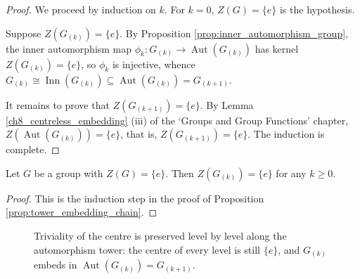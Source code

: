 \begin{proof}
We proceed by induction on $k$. For $k=0$, $Z(G)=\{e\}$ is the hypothesis.

Suppose $Z(G_{(k)})=\{e\}$. By Proposition \ref{prop:inner_automorphism_group}, the inner automorphism map $\phi_k: G_{(k)} \to \operatorname{Aut}(G_{(k)})$ has kernel $Z(G_{(k)})=\{e\}$, so $\phi_k$ is injective, whence $G_{(k)} \cong \operatorname{Inn}(G_{(k)}) \subseteq \operatorname{Aut}(G_{(k)}) = G_{(k+1)}$.

It remains to prove that $Z(G_{(k+1)})=\{e\}$. By Lemma \ref{ch8_centreless_embedding} (iii) of the `Groups and Group Functions' chapter, $Z(\operatorname{Aut}(G_{(k)}))=\{e\}$, that is, $Z(G_{(k+1)})=\{e\}$. The induction is complete.
\end{proof}

\begin{lemma}\label{ch10_centreless_preserved}
Let $G$ be a group with $Z(G)=\{e\}$. Then $Z(G_{(k)})=\{e\}$ for any $k\ge 0$.
\end{lemma}

\begin{proof}
This is the induction step in the proof of Proposition \ref{prop:tower_embedding_chain}.
\end{proof}

\begin{figure}[htbp]
\centering
{}
\caption{Triviality of the centre is preserved level by level along the automorphism tower: the centre of every level is still $\{e\}$, and $G_{(k)}$ embeds in $\operatorname{Aut}(G_{(k)})=G_{(k+1)}$.}
\label{fig:centreless_tower}
\end{figure}


